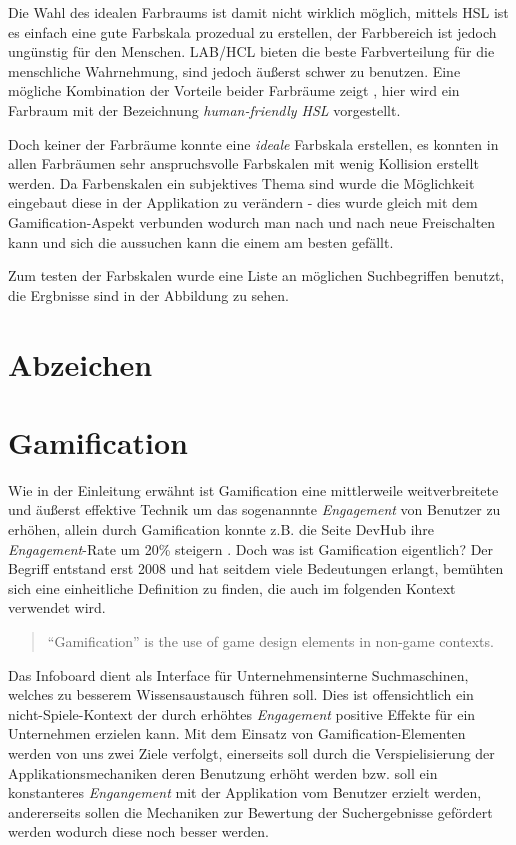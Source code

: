 \documentclass[12pt,twoside]{book}
\begin{document}
Die Wahl des idealen Farbraums ist damit nicht wirklich möglich, mittels HSL ist es einfach eine gute Farbskala prozedual zu erstellen, der Farbbereich ist jedoch ungünstig für den Menschen. LAB/HCL bieten die beste Farbverteilung für die menschliche Wahrnehmung, sind jedoch äußerst schwer zu benutzen. Eine mögliche Kombination der Vorteile beider Farbräume zeigt \citep{husl}, hier wird ein Farbraum mit der Bezeichnung \textit{human-friendly HSL} vorgestellt.

Doch keiner der Farbräume konnte eine \textit{ideale} Farbskala erstellen, es konnten in allen Farbräumen sehr anspruchsvolle Farbskalen mit wenig Kollision erstellt werden. Da Farbenskalen ein subjektives Thema sind wurde die Möglichkeit eingebaut diese in der Applikation zu verändern - dies wurde gleich mit dem Gamification-Aspekt verbunden wodurch man nach und nach neue Freischalten kann und sich die aussuchen kann die einem am besten gefällt.

Zum testen der Farbskalen wurde eine Liste an möglichen Suchbegriffen benutzt, die Ergbnisse sind in der Abbildung zu sehen.


\section{Abzeichen}

\section{Gamification}

Wie in der Einleitung erwähnt ist Gamification eine mittlerweile weitverbreitete und äußerst effektive Technik um das sogenannnte \textit{Engagement} von Benutzer zu erhöhen, allein durch Gamification konnte z.B. die Seite DevHub ihre \textit{Engagement}-Rate um 20\% steigern \citep{zichermann2011gamification}. Doch was ist Gamification eigentlich? Der Begriff entstand erst 2008 und hat seitdem viele Bedeutungen erlangt, \citep{deterding2011game} bemühten sich eine einheitliche Definition zu finden, die auch im folgenden Kontext verwendet wird.

\begin{quote}
	``Gamification'' is the use of game design elements in non-game contexts.
\end{quote}

Das Infoboard dient als Interface für Unternehmensinterne Suchmaschinen, welches zu besserem Wissensaustausch führen soll. Dies ist offensichtlich ein nicht-Spiele-Kontext der durch erhöhtes \textit{Engagement} positive Effekte für ein Unternehmen erzielen kann.
Mit dem Einsatz von Gamification-Elementen werden von uns zwei Ziele verfolgt, einerseits soll durch die Verspielisierung der Applikationsmechaniken deren Benutzung erhöht werden bzw. soll ein konstanteres \textit{Engangement} mit der Applikation vom Benutzer erzielt werden, andererseits sollen die Mechaniken zur Bewertung der Suchergebnisse gefördert werden wodurch diese noch besser werden.
\end{document}
